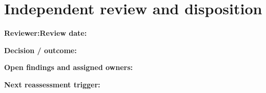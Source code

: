 \documentclass[10pt,letterpaper]{article}
\begin{document}
\section{Independent review and disposition}
\textbf{Reviewer:}\enspace\hrulefill\quad\textbf{Review date:}\enspace\hrulefill\par\medskip
\textbf{Decision / outcome:}\enspace\hrulefill\par\medskip
\textbf{Open findings and assigned owners:}\enspace\hrulefill\par\medskip
\textbf{Next reassessment trigger:}\enspace\hrulefill\par\medskip
\end{document}
